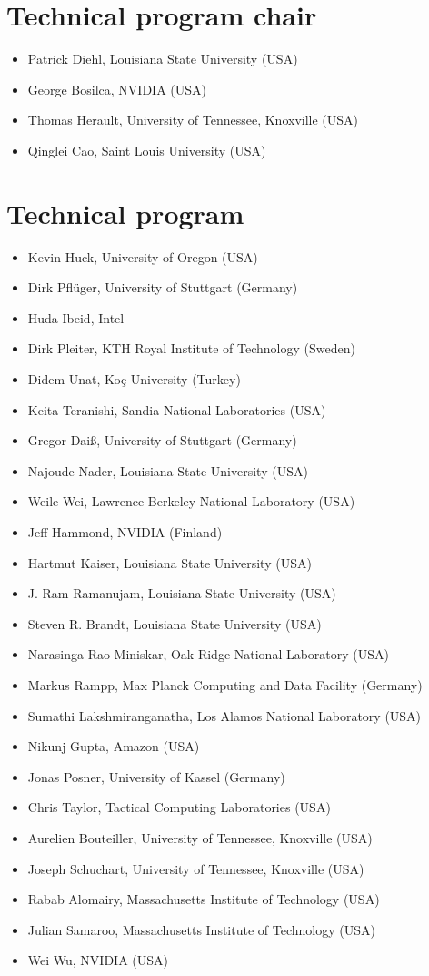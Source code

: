 \section*{Technical program chair}

\begin{itemize}
\item Patrick Diehl, Louisiana State University (USA)
\item George Bosilca, NVIDIA (USA)
\item Thomas Herault, University of Tennessee, Knoxville (USA)
\item Qinglei Cao, Saint Louis University (USA) 
\end{itemize}

\section*{Technical program }

\begin{itemize}
\item Kevin Huck, University of Oregon (USA)
\item Dirk Pflüger, University of Stuttgart (Germany)
\item Huda Ibeid, Intel
\item Dirk Pleiter, KTH Royal Institute of Technology (Sweden)
\item Didem Unat, Koç University (Turkey)
\item Keita Teranishi, Sandia National Laboratories (USA)
\item Gregor Daiß, University of Stuttgart (Germany)
\item Najoude Nader, Louisiana State University (USA)
\item Weile Wei, Lawrence Berkeley National Laboratory (USA)
\item Jeff Hammond, NVIDIA (Finland)
\item Hartmut Kaiser, Louisiana State University (USA)
\item J. Ram Ramanujam, Louisiana State University (USA)
\item Steven R. Brandt, Louisiana State University (USA)
\item Narasinga Rao Miniskar, Oak Ridge National Laboratory (USA)
\item Markus Rampp, Max Planck Computing and Data Facility (Germany)
\item Sumathi Lakshmiranganatha, Los Alamos National Laboratory (USA)
\item Nikunj Gupta, Amazon (USA)
\item Jonas Posner, University of Kassel (Germany)
\item Chris Taylor, Tactical Computing Laboratories (USA) 
\item Aurelien Bouteiller, University of Tennessee, Knoxville (USA) 
\item Joseph Schuchart, University of Tennessee, Knoxville (USA) 
\item Rabab Alomairy, Massachusetts Institute of Technology (USA) 
\item Julian Samaroo, Massachusetts Institute of Technology (USA) 
\item Wei Wu, NVIDIA (USA) 
\end{itemize}


